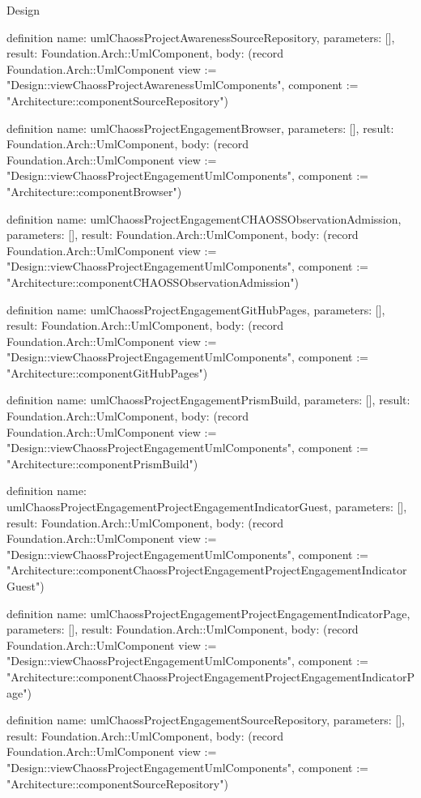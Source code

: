 \begin{lexlean}{Design}
\begin{semanticmodule}
definition{
  name: umlChaossProjectAwarenessSourceRepository,
  parameters: [],
  result: Foundation.Arch::UmlComponent,
  body: (record Foundation.Arch::UmlComponent {view := "Design::viewChaossProjectAwarenessUmlComponents", component := "Architecture::componentSourceRepository"})
}

definition{
  name: umlChaossProjectEngagementBrowser,
  parameters: [],
  result: Foundation.Arch::UmlComponent,
  body: (record Foundation.Arch::UmlComponent {view := "Design::viewChaossProjectEngagementUmlComponents", component := "Architecture::componentBrowser"})
}

definition{
  name: umlChaossProjectEngagementCHAOSSObservationAdmission,
  parameters: [],
  result: Foundation.Arch::UmlComponent,
  body: (record Foundation.Arch::UmlComponent {view := "Design::viewChaossProjectEngagementUmlComponents", component := "Architecture::componentCHAOSSObservationAdmission"})
}

definition{
  name: umlChaossProjectEngagementGitHubPages,
  parameters: [],
  result: Foundation.Arch::UmlComponent,
  body: (record Foundation.Arch::UmlComponent {view := "Design::viewChaossProjectEngagementUmlComponents", component := "Architecture::componentGitHubPages"})
}

definition{
  name: umlChaossProjectEngagementPrismBuild,
  parameters: [],
  result: Foundation.Arch::UmlComponent,
  body: (record Foundation.Arch::UmlComponent {view := "Design::viewChaossProjectEngagementUmlComponents", component := "Architecture::componentPrismBuild"})
}

definition{
  name: umlChaossProjectEngagementProjectEngagementIndicatorGuest,
  parameters: [],
  result: Foundation.Arch::UmlComponent,
  body: (record Foundation.Arch::UmlComponent {view := "Design::viewChaossProjectEngagementUmlComponents", component := "Architecture::componentChaossProjectEngagementProjectEngagementIndicatorGuest"})
}

definition{
  name: umlChaossProjectEngagementProjectEngagementIndicatorPage,
  parameters: [],
  result: Foundation.Arch::UmlComponent,
  body: (record Foundation.Arch::UmlComponent {view := "Design::viewChaossProjectEngagementUmlComponents", component := "Architecture::componentChaossProjectEngagementProjectEngagementIndicatorPage"})
}

definition{
  name: umlChaossProjectEngagementSourceRepository,
  parameters: [],
  result: Foundation.Arch::UmlComponent,
  body: (record Foundation.Arch::UmlComponent {view := "Design::viewChaossProjectEngagementUmlComponents", component := "Architecture::componentSourceRepository"})
}


\end{semanticmodule}
\end{lexlean}
